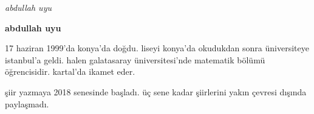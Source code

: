 \documentclass[10pt, openright, oneside]{memoir}
\theoremstyle{definition}
\begin{document}
\thispagestyle{empty}
\begin{flushright}
\end{flushright}
\begin{flushright}
  \textit{abdullah uyu}
\end{flushright}
\vfill
\begin{figure}[H]
  \centering
\end{figure}
\newpage
\textbf{abdullah uyu}

17 haziran 1999'da konya'da doğdu. liseyi
konya'da okudukdan sonra üniversiteye
istanbul'a geldi. halen galatasaray
üniversitesi'nde matematik bölümü
öğrencisidir. kartal'da ikamet eder.

şiir yazmaya 2018 senesinde başladı. üç
sene kadar şiirlerini yakın çevresi dışında
paylaşmadı.
\newpage
\tableofcontents
\end{document}
